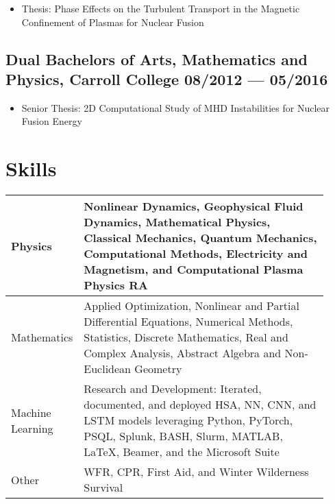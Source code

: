 \documentclass[letterpaper,11pt]{article}
\begin{document}
\begin{itemize}
    \setlength{\itemsep}{-.5pt}
    \item Thesis: Phase Effects on the Turbulent Transport in the Magnetic Confinement of Plasmas for Nuclear Fusion
\end{itemize}
\subsection*{{\color{cvblue}Dual Bachelors of Arts, Mathematics and Physics,} {Carroll College} \hfill 08/2012 --- 05/2016} 
\begin{itemize}
    \setlength{\itemsep}{-.5pt}
    \item Senior Thesis: 2D Computational Study of MHD Instabilities for Nuclear Fusion Energy
\end{itemize}



\section*{\color{cvblue}Skills}
\vspace{-.25in}
\begin{table}[h!]
    \setlength{\tabcolsep}{8pt}
    \renewcommand{\arraystretch}{2}
    \centering
    \begin{tabular}{p{0.12\linewidth} || p{0.8\linewidth}}
        Physics& Nonlinear Dynamics, Geophysical Fluid Dynamics, Mathematical Physics, Classical Mechanics,
        Quantum Mechanics, Computational Methods, Electricity and Magnetism, and Computational Plasma Physics RA \\\hline
        Mathematics& Applied Optimization, Nonlinear and Partial Differential Equations, Numerical Methods, Statistics, Discrete Mathematics, Real and Complex Analysis, Abstract Algebra and Non-Euclidean Geometry \\\hline
        Machine Learning & Research and Development: Iterated, documented, and deployed HSA, NN, CNN, and LSTM models leveraging Python, PyTorch, PSQL, Splunk, BASH, Slurm, MATLAB, \LaTeX,  Beamer, and the Microsoft Suite \\\hline
        Other& WFR, CPR, First Aid, and Winter Wilderness Survival\\\hline
    \end{tabular}
\end{table}
\end{document}
